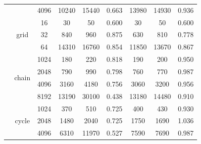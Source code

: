 \begin{table}
{\begin{tabular}{c|c|c|c|c|c|c|c|c}
   &  &  4096 &  10240 & 15440 &  0.663  & 13980 & 14930 &  0.936 \\
   \cline{2-9}
   &  \multirow{3}{*}{grid} &  16 &  30 & 50 &  0.600  & 30 & 50 &  0.600 \\
   &  &  32 &  840 & 960 &  0.875  & 630 & 810 &  0.778 \\
   &  &  64 &  14310 & 16760 &  0.854  & 11850 & 13670 &  0.867 \\
   \cline{2-9}
   &  \multirow{4}{*}{chain} &  1024 &  180 & 220 &  0.818  & 190 & 200 &  0.950 \\
   &  &  2048 &  790 & 990 &  0.798  & 760 & 770 &  0.987 \\
   &  &  4096 &  3160 & 4180 &  0.756  & 3060 & 3200 &  0.956 \\
   &  &  8192 &  13190 & 30100 &  0.438  & 13180 & 14480 &  0.910 \\
   \cline{2-9}
   &  \multirow{3}{*}{cycle} &  1024 &  370 & 510 &  0.725  & 400 & 430 &  0.930 \\
   &  &  2048 &  1480 & 2040 &  0.725  & 1750 & 1690 &  1.036 \\
   &  &  4096 &  6310 & 11970 &  0.527  & 7590 & 7690 &  0.987 \\
   \cline{2-9}
   \hline
\end{tabular}
}
\end{table}

